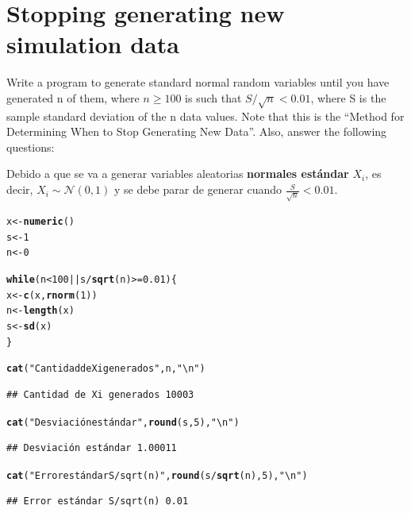 \documentclass[12pt]{article}\usepackage[]{graphicx}\usepackage[]{xcolor}
\makeatletter
\newcommand{\hlnum}[1]{\textcolor[rgb]{0.686,0.059,0.569}{#1}}%
\newcommand{\hlsng}[1]{\textcolor[rgb]{0.192,0.494,0.8}{#1}}%
\newcommand{\hlopt}[1]{\textcolor[rgb]{0,0,0}{#1}}%
\newcommand{\hldef}[1]{\textcolor[rgb]{0.345,0.345,0.345}{#1}}%
\newcommand{\hlkwa}[1]{\textcolor[rgb]{0.161,0.373,0.58}{\textbf{#1}}}%
\newcommand{\hlkwb}[1]{\textcolor[rgb]{0.69,0.353,0.396}{#1}}%
\newcommand{\hlkwd}[1]{\textcolor[rgb]{0.737,0.353,0.396}{\textbf{#1}}}%
\newenvironment{kframe}{%
 \def\at@end@of@kframe{}%
 \ifinner\ifhmode%
  \def\at@end@of@kframe{\end{minipage}}%
  \begin{minipage}{\columnwidth}%
 \fi\fi%
 \def\FrameCommand##1{\hskip\@totalleftmargin \hskip-\fboxsep
 \colorbox{shadecolor}{##1}\hskip-\fboxsep
     \hskip-\linewidth \hskip-\@totalleftmargin \hskip\columnwidth}%
 \MakeFramed {\advance\hsize-\width
   \@totalleftmargin\z@ \linewidth\hsize
   \@setminipage}}%
 {\par\unskip\endMakeFramed%
 \at@end@of@kframe}
\newenvironment{knitrout}{}{} %
\makeatother
\begin{document}
\section{Stopping generating new simulation data}

Write a program to generate standard normal random variables until you have generated n of them, where $n \geq 100$ is such that $S/\sqrt{n} < 0.01$, where S is the sample standard deviation of the n data values. Note that this is the ``Method for Determining When to Stop Generating New Data''. Also, answer the following questions:



Debido a que se va a generar variables aleatorias \textbf{normales estándar} $X_{i}$, es decir, $X_{i} \sim \mathcal{N}(0, 1)$ y se debe parar de generar cuando $\frac{S}{\sqrt{n}} < 0.01$.

\begin{knitrout}
\color{fgcolor}\begin{kframe}
\begin{alltt}
\hldef{x} \hlkwb{<-} \hlkwd{numeric}\hldef{()}
\hldef{s} \hlkwb{<-} \hlnum{1}
\hldef{n} \hlkwb{<-} \hlnum{0}

\hlkwa{while}\hldef{(n} \hlopt{<} \hlnum{100} \hlopt{||} \hldef{s} \hlopt{/} \hlkwd{sqrt}\hldef{(n)} \hlopt{>=} \hlnum{0.01}\hldef{) \{}
  \hldef{x} \hlkwb{<-} \hlkwd{c}\hldef{(x,} \hlkwd{rnorm}\hldef{(}\hlnum{1}\hldef{))}
  \hldef{n} \hlkwb{<-} \hlkwd{length}\hldef{(x)}
  \hldef{s} \hlkwb{<-} \hlkwd{sd}\hldef{(x)}
\hldef{\}}

\hlkwd{cat}\hldef{(}\hlsng{"Cantidad de Xi generados"}\hldef{, n,} \hlsng{"\textbackslash{}n"}\hldef{)}
\end{alltt}
\begin{verbatim}
## Cantidad de Xi generados 10003
\end{verbatim}
\begin{alltt}
\hlkwd{cat}\hldef{(}\hlsng{"Desviación estándar"}\hldef{,} \hlkwd{round}\hldef{(s,} \hlnum{5}\hldef{),} \hlsng{"\textbackslash{}n"}\hldef{)}
\end{alltt}
\begin{verbatim}
## Desviación estándar 1.00011
\end{verbatim}
\begin{alltt}
\hlkwd{cat}\hldef{(}\hlsng{"Error estándar S/sqrt(n)"}\hldef{,} \hlkwd{round}\hldef{(s}\hlopt{/}\hlkwd{sqrt}\hldef{(n),} \hlnum{5}\hldef{),} \hlsng{"\textbackslash{}n"}\hldef{)}
\end{alltt}
\begin{verbatim}
## Error estándar S/sqrt(n) 0.01
\end{verbatim}
\end{kframe}
\end{knitrout}
\end{document}
